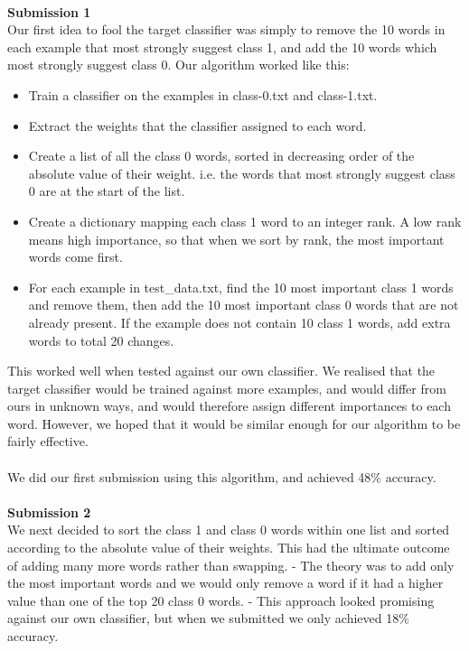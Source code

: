 \documentclass{article}
\begin{document}
\\
\textbf{\large Submission 1} \\
Our first idea to fool the target classifier was simply to remove the 10 words in each example that most strongly suggest class 1, and add the 10 words which most strongly suggest class 0. Our algorithm worked like this:
\begin{itemize}
  \item{Train a classifier on the examples in class-0.txt and class-1.txt.}
  \item{Extract the weights that the classifier assigned to each word.}
  \item{Create a list of all the class 0 words, sorted in decreasing order of the absolute value of their weight. i.e. the words that most strongly suggest class 0 are at the start of the list.}
  \item{Create a dictionary mapping each class 1 word to an integer rank. A low rank means high importance, so that when we sort by rank, the most important words come first.}
  \item{For each example in test\_data.txt, find the 10 most important class 1 words and remove them, then add the 10 most important class 0 words that are not already present. If the example does not contain 10 class 1 words, add extra words to total 20 changes.}
\end{itemize}
This worked well when tested against our own classifier. We realised that the target classifier would be trained against more examples, and would differ from ours in unknown ways, and would therefore assign different importances to each word. However, we hoped that it would be similar enough for our algorithm to be fairly effective.\\
\\
We did our first submission using this algorithm, and achieved 48\% accuracy. \\
\\
\textbf{\large Submission 2} \\
We next decided to sort the class 1 and class 0 words within one list and sorted according to the absolute value of their weights. This had the ultimate outcome of adding many more words rather than swapping. 
 - The theory was to add only the most important words and we would only remove a word if it had a higher value than one of the top 20 class 0 words.
 - This approach looked promising against our own classifier, but when we submitted we only achieved 18\% accuracy.
\end{document}
